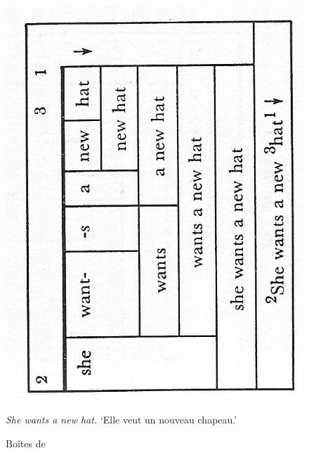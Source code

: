 {\begin{figure}[H]
    \includegraphics[width=\textwidth]{figures/vol1syntaxe2-img024.png}
    \caption{Boîtes de \citealt{hockett1958course}}
    \textit{She wants a new hat.} ‘Elle veut un nouveau chapeau.’
    \label{fig:hockett1}
\end{figure}
    
}
